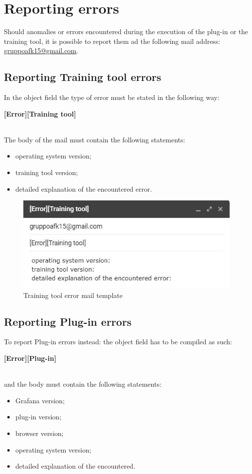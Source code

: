 \section{Reporting errors}
Should anomalies or errors encountered during the execution of the plug-in or the training tool, it is possible to report them ad the following mail address: \href{mailto:gruppoafk15@gmail.com}{gruppoafk15@gmail.com}.

\subsection{Reporting Training tool errors}
In the object field the type of error must be stated in the following way:\\ \centerline{\textbf{[Error][Training tool]}} \\
The body of the mail must contain the  following statements:

\begin{itemize}
	\item operating system version;
	\item training tool version;
	\item detailed explanation of the encountered error.
\end{itemize}

\begin{figure}[H]
\centering
\includegraphics[scale=0.85]{img/mail/tool_mail.png}
\caption{Training tool error mail template}
\end{figure}

\subsection{Reporting Plug-in errors}
To report Plug-in errors instead: the object field has to be compiled as such:\\ \centerline{\textbf{[Error][Plug-in]}} \\
and the body must contain the following statements:
\begin{itemize}
\item Grafana version;
\item plug-in version;
\item browser version;
\item operating system version;
\item  detailed explanation of the encountered.
\end{itemize}

